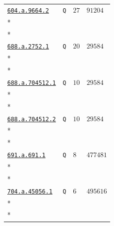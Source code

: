 \documentclass[10pt]{article}
\newcommand{\entryseparator}{\noalign{\vskip3pt\hbox to\linewidth{\leaders\hbox{\kern2pt\rule{3pt}{0.3pt}\kern2pt}\hfill}\nobreak\vskip3pt\nobreak}}
\begin{document}
\begin{landscape}
\begin{longtable}{@{}p{.4\linewidth}>{\centering\arraybackslash}p{.2\linewidth}>{\raggedleft\arraybackslash}p{.16\linewidth}>{\raggedleft\arraybackslash}p{}@{}}
\entryseparator
\href{https://www.lmfdb.org/Genus2Curve/Q/604/a/9664/2}{\texttt{604.a.9664.2}} & \texttt{Q} & $27$ & $91204$ \\*
\multicolumn{4}{@{}l@{}}{$D_{1}=6\,\left(-1,0\right)-4\,\left(1,-2\right)+\infty_{Y=-1}+\infty_{Y=0}-4\,\left(1,0\right)$} \\*
\multicolumn{4}{@{}l@{}}{$D_{2}=\left(0,-1\right)+\left(0,0\right)-\infty_{Y=-1}-\infty_{Y=0}$} \\
\entryseparator
\href{https://www.lmfdb.org/Genus2Curve/Q/688/a/2752/1}{\texttt{688.a.2752.1}} & \texttt{Q} & $20$ & $29584$ \\*
\multicolumn{4}{@{}l@{}}{$D_{1}=\left(0,-1\right)+\left(0,0\right)-2\,\infty_{Y=0}$} \\*
\multicolumn{4}{@{}l@{}}{$D_{3}=\left(1,-1\right)-2\,\infty_{Y=0}+\left(1,0\right)$} \\
\entryseparator
\href{https://www.lmfdb.org/Genus2Curve/Q/688/a/704512/1}{\texttt{688.a.704512.1}} & \texttt{Q} & $10$ & $29584$ \\*
\multicolumn{4}{@{}l@{}}{$D_{1}=-P_{1}-P_{2}+2\,\infty_{Y=0}$} \\*
\multicolumn{4}{@{}l@{}}{$D_{2}=-P_{1}-P_{2}+\left(0,1\right)+\left(0,-1\right)$} \\
\entryseparator
\href{https://www.lmfdb.org/Genus2Curve/Q/688/a/704512/2}{\texttt{688.a.704512.2}} & \texttt{Q} & $10$ & $29584$ \\*
\multicolumn{4}{@{}l@{}}{$D_{1}=\left(-\frac{1}{2},0\right)-\infty_{Y=0}$} \\*
\multicolumn{4}{@{}l@{}}{$D_{2}=\left(0,-1\right)+\left(0,1\right)-2\,\infty_{Y=0}$} \\
\entryseparator
\href{https://www.lmfdb.org/Genus2Curve/Q/691/a/691/1}{\texttt{691.a.691.1}} & \texttt{Q} & $8$ & $477481$ \\*
\multicolumn{4}{@{}l@{}}{$D_{1}=\left(0,-1\right)+\left(0,0\right)-2\,\infty_{Y=0}$} \\*
\multicolumn{4}{@{}l@{}}{$D_{2}=\left(1,-1\right)-\infty_{Y=0}$} \\
\entryseparator
\href{https://www.lmfdb.org/Genus2Curve/Q/704/a/45056/1}{\texttt{704.a.45056.1}} & \texttt{Q} & $6$ & $495616$ \\*
\multicolumn{4}{@{}l@{}}{$D_{1}=\left(-\frac{1}{2},-\frac{1}{2}\right)-\left(\frac{1}{2},-\frac{1}{2}\right)$} \\*
\multicolumn{4}{@{}l@{}}{$D_{2}=\left(0,-1\right)+\left(0,0\right)+4\,\left(\frac{1}{2},-\frac{1}{2}\right)-6\,\infty_{Y=0}$} \\

\end{longtable}
\end{landscape}
\end{document}
